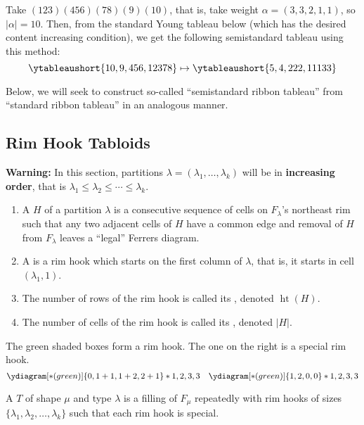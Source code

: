 \documentclass[11pt,leqno,oneside]{amsart}
\numberwithin{thm}{section}
\newcommand{\height}{\operatorname{ht}}
\begin{document}
\begin{example}
  Take \((123)(456)(78)(9)(10)\), that is, take weight \(\alpha =
  (3,3,2,1,1)\), so \(|\alpha|=10\). Then, from the standard Young
  tableau below (which has the desired content increasing condition),
  we get the following 
  semistandard tableau using this method: \[
    \ytableaushort{{10},9,456,12378} \mapsto \ytableaushort{5,4,222,11133}
  \]
\end{example}
Below, we will seek to construct so-called ``semistandard ribbon
tableau'' from ``standard ribbon tableau'' in an analogous manner.
\subsection{Rim Hook Tabloids}
\textbf{Warning:} In this section, partitions \(\lambda = (\lambda_1, \ldots,
\lambda_k)\) will be in \textbf{increasing order}, that is \(\lambda_1
\leq \lambda_2 \leq \cdots \leq \lambda_k\).
\begin{defn}
  \begin{enumerate}
  \item A  \(H\) of a partition \(\lambda\) is a
    consecutive sequence of cells on \(F_\lambda\)'s northeast rim
    such that any two adjacent cells of \(H\) have a common edge and
    removal of \(H\) from \(F_\lambda\) leaves a ``legal'' Ferrers
    diagram.
  \item A  is a rim hook which starts on the
    first column of \(\lambda\), that is, it starts in cell
    \((\lambda_1,1)\). 
  \item The number of rows of the rim hook is called its ,
    denoted \(\height(H)\).
  \item The number of cells of the rim hook is called its ,
    denoted \(|H|\).
  \end{enumerate}
\end{defn}
\begin{example}
  The green shaded boxes form a rim hook. The one on the right is a
  special rim hook.
  \[
    \ydiagram[*(green)]{0,1+1,1+2,2+1}*{1,2,3,3} \ \ \ \ydiagram[*(green)]{1,2,0,0}*{1,2,3,3}
  \]
\end{example}
\begin{defn}
  A  \(T\) of shape \(\mu\) and type
  \(\lambda\) is a filling of \(F_\mu\) repeatedly with rim hooks of
  sizes \(\{\lambda_1, \lambda_2, \ldots, \lambda_k\}\) such that each
  rim hook is special. 
\end{defn}
\end{document}
